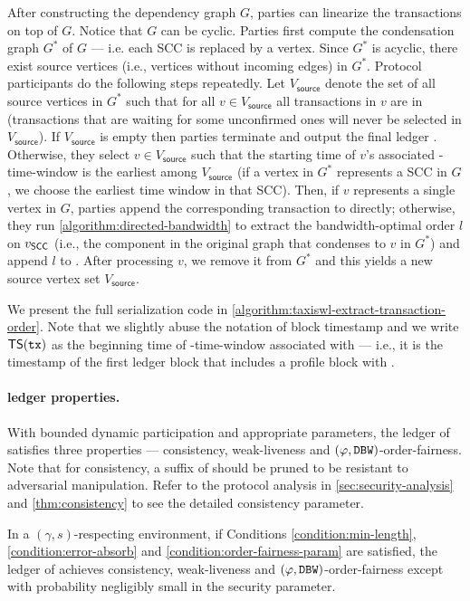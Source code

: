 After constructing the dependency graph $G$, parties can linearize the transactions on top of $G$.
%
Notice that $G$ can be cyclic. Parties first compute the condensation graph $G^*$ of $G$ --- i.e. each SCC is replaced by a vertex.
%
Since $G^*$ is acyclic, there exist source vertices (i.e., vertices without incoming edges) in $G^*$.
%
Protocol participants do the following steps repeatedly.
%
Let $V_{\mathsf{source}}$ denote the set of all source vertices in $G^*$ such that for all $v \in V_{\mathsf{source}}$ all transactions in $v$ are in \txpool (transactions that are waiting for some unconfirmed ones will never be selected in $V_{\mathsf{source}}$).
%
If $V_{\mathsf{source}}$ is empty then parties terminate and output the final ledger \ledger.
%
Otherwise, they select $v \in V_{\mathsf{source}}$ such that the starting time of $v$'s associated \PBWindowLen-time-window is the earliest among $V_{\mathsf{source}}$ (if a vertex in $G^*$ represents a SCC in $G$, we choose the earliest time window in that SCC).
%
Then, if $v$ represents a single vertex in $G$, parties append the corresponding transaction to \ledger directly; otherwise, they run \cref{algorithm:directed-bandwidth} to extract the bandwidth-optimal order $l$ on $v_\mathsf{SCC}$ (i.e., the component in the original graph that condenses to $v$ in $G^*$) and append $l$ to \ledger.
%
After processing $v$, we remove it from $G^*$ and this yields a new source vertex set $V_{\mathsf{source}}$.

We present the full serialization code in \cref{algorithm:taxiswl-extract-transaction-order}.
%
Note that we slightly abuse the notation of block timestamp and we write $\mathsf{TS}(\mathtt{tx})$ as the beginning time of \PBWindowLen-time-window associated with \tx --- i.e., it is the timestamp of the first ledger block \LB that includes a profile block with \tx.



\paragraph{\TaxisWL ledger properties.}
%
With bounded dynamic participation and appropriate parameters, the ledger \ledger of \TaxisWL satisfies three properties --- consistency, weak-liveness and  $(\varphi, \mathtt{DBW})$-order-fairness.
%
Note that for consistency, a suffix of \ledger should be pruned to be resistant to adversarial manipulation.
%
Refer to the protocol analysis in \cref{sec:security-analysis} and \cref{thm:consistency} to see the detailed consistency parameter.

\begin{theorem}[Informal]
    In a $(\gamma, s)$-respecting environment, if Conditions \eqref{condition:min-length}, \eqref{condition:error-absorb} and \eqref{condition:order-fairness-param} are satisfied, the ledger \ledger of \TaxisWL achieves consistency, weak-liveness and $(\varphi, \mathtt{DBW})$-order-fairness except with probability negligibly small in the security parameter.
\end{theorem}
